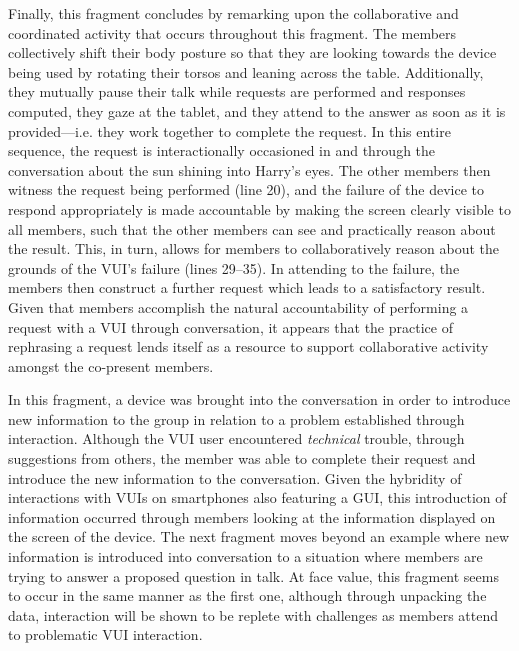 \begin{revisedsubmission}
Finally, this fragment concludes by remarking upon the collaborative and coordinated activity that occurs throughout this fragment.
The members collectively shift their body posture so that they are looking towards the device being used by rotating their torsos and leaning across the table.
Additionally, they mutually pause their talk while requests are performed and responses computed, they gaze at the tablet, and they attend to the answer as soon as it is provided---i.e. they work together to complete the request.
In this entire sequence, the request is interactionally occasioned in and through the conversation about the sun shining into Harry's eyes.
The other members then witness the request being performed (line 20), and the failure of the device to respond appropriately is made accountable by making the screen clearly visible to all members, such that the other members can see and practically reason about the result.
This, in turn, allows for members to collaboratively reason about the grounds of the \ac{VUI}'s failure (lines 29--35).
In attending to the failure, the members then construct a further request which leads to a satisfactory result.
Given that members accomplish the natural accountability of performing a request with a \ac{VUI} through conversation, it appears that the practice of rephrasing a request lends itself as a resource to support collaborative activity amongst the co-present members.

In this fragment, a device was brought into the conversation in order to introduce new information to the group in relation to a problem established through interaction.
Although the \ac{VUI} user encountered \textit{technical} trouble, through suggestions from others, the member was able to complete their request and introduce the new information to the conversation.
Given the hybridity of interactions with \acp{VUI} on smartphones also featuring a \ac{GUI}, this introduction of information occurred through members looking at the information displayed on the screen of the device.
The next fragment moves beyond an example where new information is introduced into conversation to a situation where members are trying to answer a proposed question in talk.
At face value, this fragment seems to occur in the same manner as the first one, although through unpacking the data, interaction will be shown to be replete with challenges as members attend to problematic \ac{VUI} interaction.
\end{revisedsubmission}



